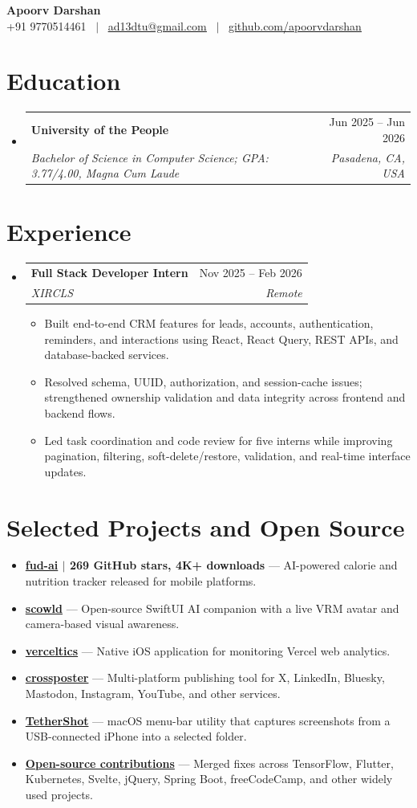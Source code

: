 \documentclass[letterpaper,10pt]{article}
\makeatletter
\newcommand{\resumeSubHeadingListStart}{\begin{itemize}[leftmargin=0in,label={}]}
\newcommand{\resumeSubHeadingListEnd}{\end{itemize}}
\newcommand{\resumeItemListStart}{\begin{itemize}[leftmargin=0.18in,nosep,itemsep=1pt,topsep=2pt]}
\newcommand{\resumeItemListEnd}{\end{itemize}\vspace{-3pt}}
\newcommand{\resumeItem}[1]{\item\small #1}
\newcommand{\resumeSubheading}[4]{
  \item
  \begin{tabular*}{\textwidth}[t]{l@{\extracolsep{\fill}}r}
    \textbf{#1} & #2 \\
    \textit{\small #3} & \textit{\small #4} \\
  \end{tabular*}\vspace{-7pt}
}
\newcommand{\resumeProject}[2]{
  \item\small
  \textbf{#1} --- #2\vspace{-1pt}
}
\makeatother
\begin{document}
\begin{center}
  {\Huge\textbf{Apoorv Darshan}}\\[4pt]
  \small
  +91 9770514461 \ $|$ \
  \href{mailto:ad13dtu@gmail.com}{\underline{ad13dtu@gmail.com}} \ $|$ \
  \href{https://github.com/apoorvdarshan}{\underline{github.com/apoorvdarshan}}
\end{center}

\section{Education}
\resumeSubHeadingListStart
  \resumeSubheading
    {University of the People}{Jun 2025 -- Jun 2026}
    {Bachelor of Science in Computer Science; GPA: 3.77/4.00, Magna Cum Laude}{Pasadena, CA, USA}
\resumeSubHeadingListEnd

\section{Experience}
\resumeSubHeadingListStart
  \resumeSubheading
    {Full Stack Developer Intern}{Nov 2025 -- Feb 2026}
    {XIRCLS}{Remote}
  \resumeItemListStart
    \resumeItem{Built end-to-end CRM features for leads, accounts, authentication, reminders, and interactions using React, React Query, REST APIs, and database-backed services.}
    \resumeItem{Resolved schema, UUID, authorization, and session-cache issues; strengthened ownership validation and data integrity across frontend and backend flows.}
    \resumeItem{Led task coordination and code review for five interns while improving pagination, filtering, soft-delete/restore, validation, and real-time interface updates.}
  \resumeItemListEnd
\resumeSubHeadingListEnd

\section{Selected Projects and Open Source}
\resumeSubHeadingListStart
  \resumeProject{\href{https://github.com/apoorvdarshan/fud-ai}{fud-ai} $|$ 269 GitHub stars, 4K+ downloads}{AI-powered calorie and nutrition tracker released for mobile platforms.}
  \resumeProject{\href{https://github.com/apoorvdarshan/scowld}{scowld}}{Open-source SwiftUI AI companion with a live VRM avatar and camera-based visual awareness.}
  \resumeProject{\href{https://github.com/apoorvdarshan/verceltics}{verceltics}}{Native iOS application for monitoring Vercel web analytics.}
  \resumeProject{\href{https://github.com/apoorvdarshan/crossposter}{crossposter}}{Multi-platform publishing tool for X, LinkedIn, Bluesky, Mastodon, Instagram, YouTube, and other services.}
  \resumeProject{\href{https://github.com/apoorvdarshan/TetherShot}{TetherShot}}{macOS menu-bar utility that captures screenshots from a USB-connected iPhone into a selected folder.}
  \resumeProject{\href{https://github.com/pulls?q=is\%3Apr+author\%3Aapoorvdarshan+is\%3Amerged}{Open-source contributions}}{Merged fixes across TensorFlow, Flutter, Kubernetes, Svelte, jQuery, Spring Boot, freeCodeCamp, and other widely used projects.}
\resumeSubHeadingListEnd
\end{document}
